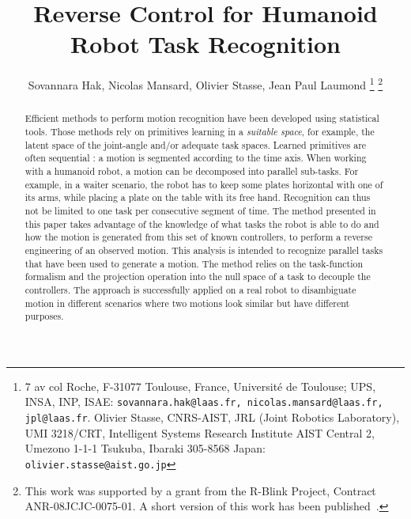 \documentclass[journal]{IEEEtran}
\begin{document}
\title{\LARGE Reverse Control for Humanoid Robot Task Recognition}

\author{Sovannara Hak, Nicolas Mansard, Olivier Stasse, Jean Paul Laumond%
  \thanks{7 av col Roche, F-31077 Toulouse, France, Universit\'e de Toulouse; UPS, INSA, INP,
    ISAE: {\tt\small sovannara.hak@laas.fr, nicolas.mansard@laas.fr, jpl@laas.fr}. Olivier
    Stasse, CNRS-AIST, JRL (Joint Robotics Laboratory), UMI 3218/CRT,
    Intelligent Systems Research Institute AIST Central 2, Umezono 1-1-1
    Tsukuba, Ibaraki 305-8568 Japan: {\tt\small olivier.stasse@aist.go.jp}}
  \thanks{This work was supported by a grant from the R-Blink Project, Contract
  ANR-08JCJC-0075-01. A short version of this work has been published~\cite{hak10}.}  }

%
\maketitle


\begin{abstract}
Efficient methods to perform motion recognition have been developed
using statistical tools. Those methods rely on primitives learning
in a \emph{suitable space}, for example, the latent space of the joint-angle and/or adequate task spaces.
Learned primitives are often sequential : a motion is segmented according to the time axis.
When working with a humanoid robot, a motion can be decomposed into
parallel sub-tasks. For example, in a waiter scenario,
the robot has to keep some plates horizontal with one of its arms, while placing a plate
on the table with its free hand.
Recognition can thus not be limited to one task per consecutive segment of 
time.
The method presented in this paper
takes advantage of the knowledge of what tasks the robot is able to do and how
the motion is generated from this set of known controllers, to perform a reverse engineering of an
observed motion. This analysis is intended to recognize parallel tasks that
have been used to generate a motion. The method relies
on the task-function formalism and the projection operation into the null space of a task to decouple
the controllers.
The approach is successfully applied on a real robot
to disambiguate motion in different scenarios where two motions look similar but have
different purposes.
\end{abstract}
\end{document}
